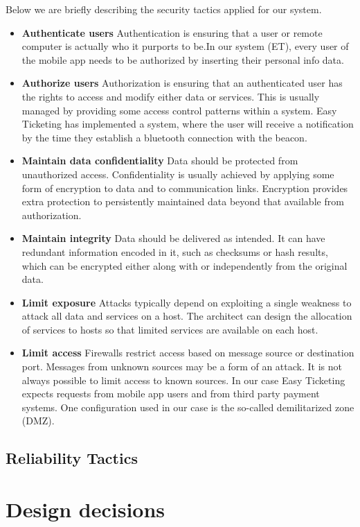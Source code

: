 Below we are briefly describing the security tactics applied for our system.
\begin{itemize} 

\item \textbf{Authenticate users}
Authentication is ensuring that a user or remote computer is actually who it purports to be.In our system (ET), every user of the mobile app needs to be authorized by inserting their personal info data. 

\item \textbf{Authorize users}
Authorization is ensuring that an authenticated user has the rights to access and modify either data or services. This is usually managed by providing some access control patterns within a system. Easy Ticketing has implemented a system, where the user will receive a notification by the time they establish a bluetooth connection with the beacon.

\item \textbf{Maintain data confidentiality} 
Data should be protected from unauthorized access. Confidentiality is usually achieved by applying some form of encryption to data and to communication links. Encryption provides extra protection to persistently maintained data beyond that available from authorization. 

\item \textbf{Maintain integrity} Data should be delivered as intended. It can have redundant information encoded in it, such as checksums or hash results, which can be encrypted either along with or independently from the original data.

\item \textbf{Limit exposure} Attacks typically depend on exploiting a single weakness to attack all data and services on a host. The architect can design the allocation of services to hosts so that limited services are available on each host.

\item \textbf{Limit access} Firewalls restrict access based on message source or destination port. Messages from unknown sources may be a form of an attack. It is not always possible to limit access to known sources. In our case Easy Ticketing  expects requests from mobile app users and from third party payment systems.  One configuration used in our case is the so-called demilitarized zone (DMZ). 
\end{itemize} 



\subsection{Reliability Tactics}

\section{Design decisions}
\label{chp:design_decisions}
